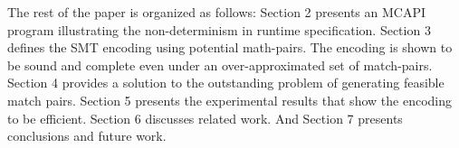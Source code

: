 The rest of the paper is organized as follows: Section 2 presents an
MCAPI program illustrating the non-determinism in runtime
specification. Section 3 defines the SMT encoding using potential
math-pairs. The encoding is shown to be sound and complete even under
an over-approximated set of match-pairs. Section 4 provides a solution
to the outstanding problem of generating feasible match pairs. Section
5 presents the experimental results that show the encoding to be
efficient. Section 6 discusses related work. And Section 7 presents
conclusions and future work.

